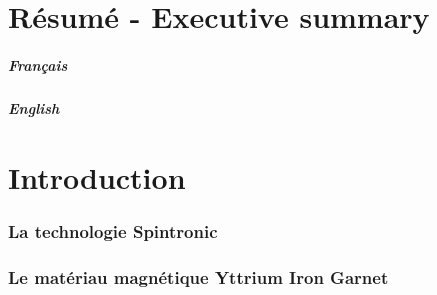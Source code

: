 \documentclass[12pt,fleqn]{book} %
\begin{document}
\part{Résumé - Executive summary}
\subsubsection{Français}

\subsubsection{English}




\pagestyle{empty} %

\tableofcontents %

\pagestyle{fancy}
\part{Introduction}

\setcounter{chapter}{1}
\section{La technologie Spintronic}

\section{Le matériau magnétique Yttrium Iron Garnet}
\end{document}

